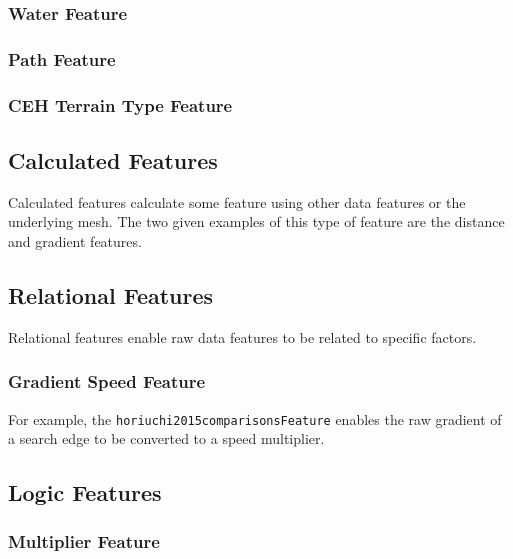 \documentclass[12pt]{article}
\begin{document}
\subsubsection{Water Feature}

\subsubsection{Path Feature}

\subsubsection{CEH Terrain Type Feature}

\subsection{Calculated Features}

Calculated features calculate some feature using other data features or the underlying mesh. The two given examples of this type of feature are the distance and gradient features.

\subsection{Relational Features}

Relational features enable raw data features to be related to specific factors.

\subsubsection{Gradient Speed Feature}

For example, the \texttt{horiuchi2015comparisonsFeature} enables the raw gradient of a search edge to be converted to a speed multiplier.

\subsection{Logic Features}

\subsubsection{Multiplier Feature}
\end{document}
